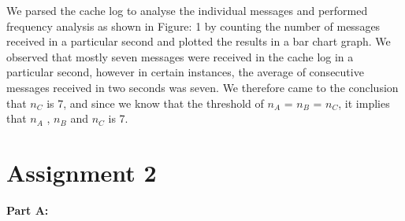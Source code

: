 \documentclass[preprint,12pt,3p]{elsarticle}
\begin{document}
We parsed the cache log to analyse the individual messages and performed frequency analysis as shown in Figure: 1 by counting the number of messages received in a particular second and plotted the results in a bar chart graph. We observed that mostly seven messages were received in the cache log in a particular second, however in certain instances, the average of consecutive messages received in two seconds was seven. We therefore came to the conclusion that $n_C$ is 7, and since we know that the threshold of $n_A$ = $n_B$ = $n_C$, it implies that $n_A$ , $n_B$ and $n_C$ is 7.

\section*{Assignment 2}
\textbf{Part A:}
\newline
\end{document}
